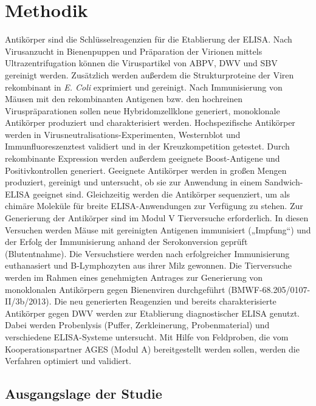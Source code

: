 \section{Methodik}

Antikörper sind die Schlüsselreagenzien für die Etablierung der ELISA. Nach Virusanzucht in Bienenpuppen und Präparation der Virionen mittels Ultrazentrifugation können die Viruspartikel von ABPV, DWV und SBV gereinigt werden. Zusätzlich werden außerdem die Strukturproteine der Viren rekombinant in \textit{E. Coli} exprimiert und gereinigt. Nach Immunisierung von Mäusen mit den rekombinanten Antigenen bzw. den hochreinen Viruspräparationen sollen neue Hybridomzellklone generiert, monoklonale Antikörper produziert und charakterisiert werden. Hochspezifische Antikörper werden in Virusneutralisations-Experimenten, Westernblot und Immunfluoreszenztest validiert und in der Kreuzkompetition getestet. Durch rekombinante Expression werden außerdem geeignete Boost-Antigene und Positivkontrollen generiert. Geeignete Antikörper werden in großen Mengen produziert, gereinigt und untersucht, ob sie zur Anwendung in einem Sandwich-ELISA geeignet sind. Gleichzeitig werden die Antikörper sequenziert, um als chimäre Moleküle für breite ELISA-Anwendungen zur Verfügung zu stehen. Zur Generierung der Antikörper sind im Modul V Tierversuche erforderlich. In diesen Versuchen werden Mäuse mit gereinigten Antigenen immunisiert („Impfung“) und der Erfolg der Immunisierung anhand der Serokonversion geprüft (Blutentnahme). Die Versuchstiere werden nach erfolgreicher Immunisierung euthanasiert und B-Lymphozyten aus ihrer Milz gewonnen. Die Tierversuche werden im Rahmen eines genehmigten Antrages zur Generierung von monoklonalen Antikörpern gegen Bienenviren durchgeführt (BMWF-68.205/0107-II/3b/2013). Die neu generierten Reagenzien und bereits charakterisierte Antikörper gegen DWV werden zur Etablierung diagnostischer ELISA genutzt. Dabei werden Probenlysis (Puffer, Zerkleinerung, Probenmaterial) und verschiedene ELISA-Systeme untersucht. Mit Hilfe von Feldproben, die vom Kooperationspartner AGES (Modul A) bereitgestellt werden sollen, werden die Verfahren optimiert und validiert.

\subsection{Ausgangslage der Studie}


